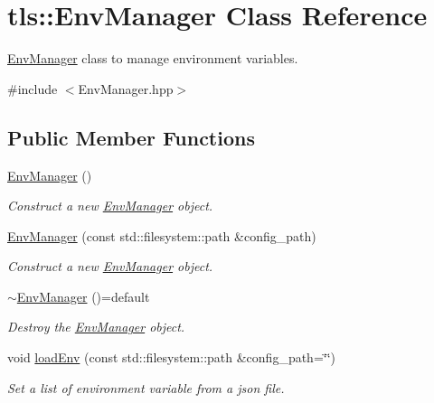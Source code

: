 \hypertarget{classtls_1_1_env_manager}{}\section{tls\+:\+:Env\+Manager Class Reference}
\label{classtls_1_1_env_manager}


\hyperlink{classtls_1_1_env_manager}{Env\+Manager} class to manage environment variables.  




{\ttfamily \#include $<$Env\+Manager.\+hpp$>$}

\subsection*{Public Member Functions}
\begin{DoxyCompactItemize}
\item 
\hyperlink{classtls_1_1_env_manager_a73654081360600e2dd650eea02f82a23}{Env\+Manager} ()
\begin{DoxyCompactList}\small\item\em Construct a new \hyperlink{classtls_1_1_env_manager}{Env\+Manager} object. \end{DoxyCompactList}\item 
\hyperlink{classtls_1_1_env_manager_ad603a242e488ddbda5a54b23aefe2013}{Env\+Manager} (const std\+::filesystem\+::path \&config\+\_\+path)
\begin{DoxyCompactList}\small\item\em Construct a new \hyperlink{classtls_1_1_env_manager}{Env\+Manager} object. \end{DoxyCompactList}\item 
\hyperlink{classtls_1_1_env_manager_aaff18dcf5a41cefdaa1a5b2123a456a0}{$\sim$\+Env\+Manager} ()=default
\begin{DoxyCompactList}\small\item\em Destroy the \hyperlink{classtls_1_1_env_manager}{Env\+Manager} object. \end{DoxyCompactList}\item 
void \hyperlink{classtls_1_1_env_manager_ad48562c6efa024230850b73d9d6361fb}{load\+Env} (const std\+::filesystem\+::path \&config\+\_\+path=\char`\"{}\char`\"{})
\begin{DoxyCompactList}\small\item\em Set a list of environment variable from a json file. \end{DoxyCompactList}\end{DoxyCompactItemize}

